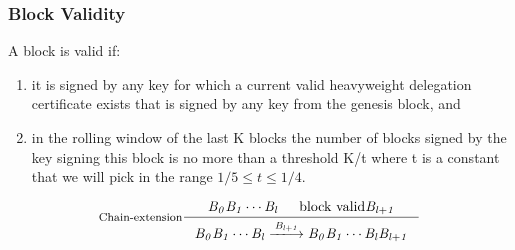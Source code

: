 \documentclass[11pt,a4paper]{article}
\newcommand{\var}[1]{\mathit{#1}}
\newcommand{\trans}[2]{\xlongrightarrow[\textsc{#1}]{#2}}
\begin{document}
\subsubsection{Block Validity}
\label{sec:block-valid}
A block is valid if:
\begin{enumerate}
\item it is signed by any key for which a current valid heavyweight delegation
  certificate exists that is signed by any key from the genesis block, and
\item in the rolling window of the last K blocks the number of blocks signed
  by the key signing this block is no more than a threshold K/t where t is a
  constant that we will pick in the range $1/5 \leq t \leq 1/4$.
\end{enumerate}


\begin{equation}
  \label{eq:block-valid}
  \inference[Chain-extension]
  {\var{B_0}\var{B_1}\cdots\var{B_l} & \text{block valid} \var{B_{l+1}}
  }
  {{\var{B_0}\var{B_1}\cdots\var{B_l}} \trans{}{\var{B_{l+1}}} {\var{B_0}\var{B_1}\cdots\var{B_l}\var{B_{l+1}}}}
\end{equation}
\end{document}
